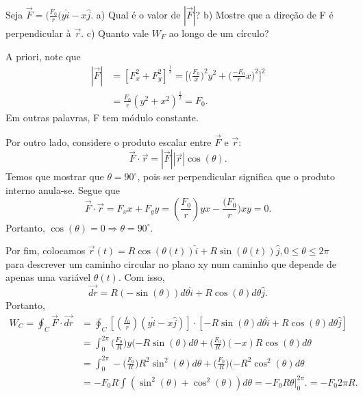 \documentclass[physics_notes.tex]{subfiles}
\begin{document}
\begin{example}
	Seja \(\vec{F} = (\frac{F_{0}}{r}(y\hat{i}-x\hat{j}\). a) Qual é o valor de \(|\vec{F}|\)? b) Mostre que a direção de F é perpendicular à \(\vec{r}\).
	c) Quanto vale \(W_{F}\) ao longo de um círculo?

	A priori, note que
	\begin{align*}
		|\vec{F}| & = [F_{x}^{2} + F_{y}^{2}]^{\frac{1}{2}} = \biggl[\biggl(\frac{F_{0}}{x}\biggr)^{2}y^{2} + \biggl(\frac{-F_{0}}{r}x\biggr)^{2}\biggr]^{2} \\
		          & = \frac{F_{0}}{r}(y^{2}+x^{2})^{\frac{1}{2}} = F_{0}.
	\end{align*}
	Em outras palavras, F tem módulo constante.

	Por outro lado, considere o produto escalar entre \(\vec{F}\) e \(\vec{r}\):
	\[
		\vec{F}\cdot \vec{r} = |\vec{F}||\vec{r}|\cos{(\theta )}.
	\]
	Temos que mostrar que \(\theta = 90^{\circ}\), pois ser perpendicular significa que o produto interno anula-se. Segue que
	\[
		\vec{F}\cdot \vec{r} = F_{x}x + F_{y}y = (\frac{F_{0}}{r})yx - \frac{(F_{0}}{r})xy = 0.
	\]
	Portanto, \(\cos{(\theta )} = 0 \Rightarrow \theta =90^{\circ}\).

	Por fim, colocamos \(\vec{r}(t) = R\cos{(\theta (t))}\hat{i} + R\sin{(\theta (t))}\hat{j}, 0\leq \theta \leq 2\pi \) para descrever um caminho circular
	no plano xy num caminho que depende de apenas uma variável \(\theta (t)\). Com isso,
	\[
		\vec{dr} = R(-\sin{(\theta )})d\theta \hat{i} + R\cos{(\theta )}d\theta \hat{j}.
	\]
	Portanto,
	\begin{align*}
		W_{C} = \oint_{C}\vec{F}\cdot \vec{dr} & = \oint_{C}[(\frac{f_{0}}{r})(y\hat{i}-x\hat{j})]\cdot [-R\sin{(\theta )}d\theta \hat{i} + R\cos{(\theta )}d\theta \hat{j}]                       \\
		                                       & = \int_{0}^{2\pi }\biggl(\frac{F_{0}}{R}\biggr)y(-R\sin{(\theta )d\theta } + \biggl(\frac{F_{0}}{R}\biggr)(-x)R\cos{(\theta )}d\theta             \\
		                                       & = \int_{0}^{2\pi }-\biggl(\frac{F_{0}}{R}\biggr)R^{2}\sin^{2}{(\theta )}d\theta  + \biggl(\frac{F_{0}}{R}\biggr)(-R^{2}\cos^{2}{(\theta )}d\theta \\
		                                       & = -F_{0}R \int_{}^{}(\sin^{2}{(\theta )} + \cos^{2}{(\theta )})d\theta  = -F_{0}R\theta \biggl|_{0}^{2\pi }\biggr. = -F_{0}2\pi R.
	\end{align*}
\end{example}
\end{document}
